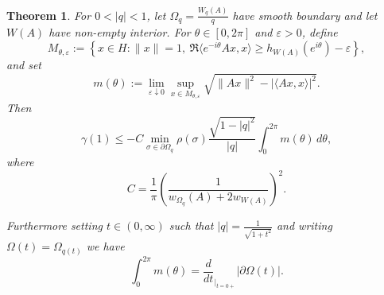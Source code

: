 \documentclass{article}
\newtheorem{Theorem}{Theorem}[section]
\begin{document}
\begin{Theorem}
For $0 < |q| < 1$, let $\Omega_q = \frac{W_q(A)}{q}$ have smooth boundary and let $W(A)$ have non-empty interior. For $\theta\in[0,2\pi]$ and $\varepsilon>0$, define
\[
M_{\theta,\varepsilon}
:=
\left\{
x\in H:\|x\|=1,\ 
\Re\langle e^{-i\theta}Ax,x\rangle
\ge h_{W(A)}(e^{i\theta})-\varepsilon
\right\},
\]
and set
\[
m(\theta)
:=
\lim_{\varepsilon\downarrow 0}
\sup_{x\in M_{\theta,\varepsilon}}
\sqrt{\|Ax\|^2-|\langle Ax,x\rangle|^2}.
\]
Then
\[
\gamma(1)\le
-C\min_{\sigma\in\partial\Omega_q}\rho(\sigma)
\frac{\sqrt{1-|q|^2}}{|q|}
\int_0^{2\pi} m(\theta)\,d\theta,
\]
where
\[
C=\frac1\pi\left(\frac{1}{w_{\Omega_q}(A)+2w_{W(A)}}\right)^2.
\]

















Furthermore setting $t \in (0, \infty)$ such that $|q| = \frac{1}{\sqrt{1+t^2}}$ and writing $ \Omega(t) =  \Omega_{q(t)}$ we have 
$$
\int_0^{2 \pi} m(\theta) = \frac{d}{dt}_{|_{t=0+}}\left|\partial\Omega(t) \right|.
$$
\end{Theorem}
\end{document}
